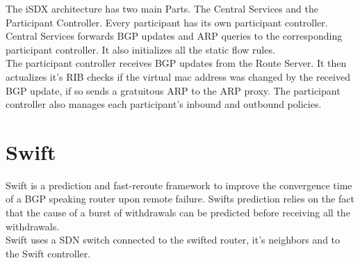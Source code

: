 The iSDX architecture has two main Parts. The Central Services and the Participant Controller. Every participant has its own participant controller. \\
Central Services forwards BGP updates and ARP queries to the corresponding participant controller. It also initializes all the static flow rules. \\
The participant controller receives BGP updates from the Route Server. It then actualizes it's RIB checks if the virtual mac address was changed by the received BGP update, if so sends a gratuitous ARP to the ARP proxy. The participant controller also manages each participant's inbound and outbound policies. 

\section{\label{chapter2:Swift}Swift}


Swift is a prediction and fast-reroute framework to improve the convergence time of a BGP speaking router upon remote failure. Swifts prediction relies on the fact that the cause of a burst of withdrawals can be predicted before receiving all the withdrawals. \\ Swift uses a SDN switch connected to the swifted router, it's neighbors and to the Swift controller. 


